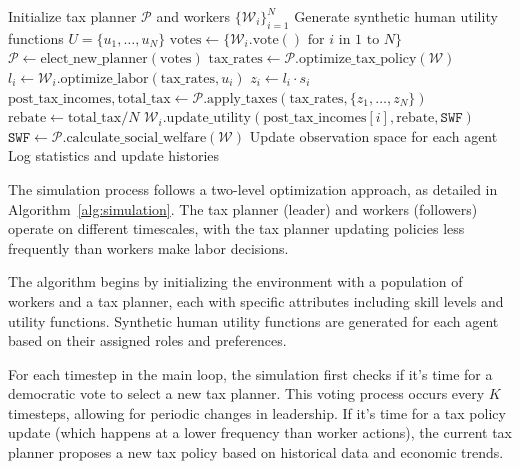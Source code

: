 \begin{algorithm}[h]
\caption{2-Level Economic Sim with LLM Agents}
\label{alg:simulation}
\begin{algorithmic}
\STATE Initialize tax planner $\mathcal{P}$ and workers $\{\mathcal{W}_i\}_{i=1}^N$
\STATE Generate synthetic human utility functions $U = \{u_1, \ldots, u_N\}$
        \STATE $\text{votes} \gets \{\mathcal{W}_i.\text{vote}() \text{ for } i \text{ in } 1 \text{ to } N\}$
        \STATE $\mathcal{P} \gets \text{elect\_new\_planner}(\text{votes})$
    \ENDIF
        \STATE $\text{tax\_rates} \gets \mathcal{P}.\text{optimize\_tax\_policy}({\mathcal{W}})$
    \ENDIF
        \STATE $l_i \gets \mathcal{W}_i.\text{optimize\_labor}(\text{tax\_rates}, u_i)$
        \STATE $z_i \gets l_i \cdot s_i$  
    \ENDFOR
    \STATE $\text{post\_tax\_incomes}, \text{total\_tax} \gets \mathcal{P}.\text{apply\_taxes}(\text{tax\_rates}, \{z_1, \ldots, z_N\})$
    \STATE $\text{rebate} \gets \text{total\_tax} / N$
        \STATE $\mathcal{W}_i.\text{update\_utility}(\text{post\_tax\_incomes}[i], \text{rebate}, \texttt{SWF})$
    \ENDFOR
    \STATE $\texttt{SWF} \gets \mathcal{P}.\text{calculate\_social\_welfare}({\mathcal{W}})$
    \STATE Update observation space for each agent
    \STATE Log statistics and update histories
\ENDFOR
\end{algorithmic}
\end{algorithm}


The simulation process follows a two-level optimization approach, as detailed in Algorithm~\ref{alg:simulation}. The tax planner (leader) and workers (followers) operate on different timescales, with the tax planner updating policies less frequently than workers make labor decisions.

The algorithm begins by initializing the environment with a population of workers and a tax planner, each with specific attributes including skill levels and utility functions. Synthetic human utility functions are generated for each agent based on their assigned roles and preferences.

For each timestep in the main loop, the simulation first checks if it's time for a democratic vote to select a new tax planner. This voting process occurs every $K$ timesteps, allowing for periodic changes in leadership. If it's time for a tax policy update (which happens at a lower frequency than worker actions), the current tax planner proposes a new tax policy based on historical data and economic trends.

